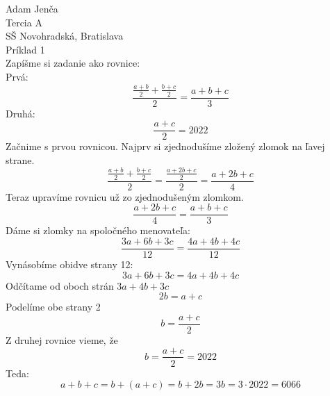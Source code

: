 \documentclass{article}
\begin{document}
\noindent
Adam Jenča\\
Tercia A\\
SŠ Novohradská, Bratislava\\
Príklad 1\\
\vskip 10mm \noindent
Zapíšme si zadanie ako rovnice:\\
Prvá:
$$
	\frac{\frac{a + b}{2} + \frac{b + c}{2}}{2} = \frac{a+b+c}{3}
$$
Druhá:
$$
	\frac{a + c}{2} = 2022
$$
Začnime s prvou rovnicou.
Najprv si zjednodušíme zložený zlomok na ľavej strane.
$$
	\frac{\frac{a + b}{2} + \frac{b + c}{2}}{2} = \frac{\frac{a+2b+c}{2}}{2} = \frac{a+2b+c}{4}
$$
Teraz upravíme rovnicu už zo zjednodušeným zlomkom.
$$
	\frac{a+2b+c}{4} =  \frac{a+b+c}{3}
$$
Dáme si zlomky na spoločného menovateľa:
$$
	\frac{3a+6b+3c}{12} = \frac{4a+4b+4c}{12}
$$
Vynásobíme obidve strany 12:
$$
	3a+6b+3c = 4a+4b+4c
$$
Odčítame od oboch strán $3a+4b+3c$
$$
	2b = a+c
$$
Podelíme obe strany 2
$$
	b = \frac{a+c}{2}
$$
Z druhej rovnice vieme, že
$$
	b = \frac{a+c}{2} = 2022
$$
Teda:
$$
	a+b+c = b + (a+c) = b + 2b = 3b = 3 \cdot 2022 = 6066
$$
\end{document}
